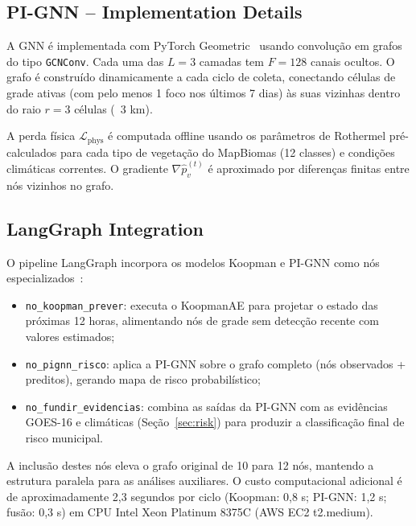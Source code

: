 \documentclass[preprint,times,numbers]{elsarticle}
\begin{document}
\subsection{PI-GNN -- Implementation Details}
\label{sec:pignn-impl}

A GNN é implementada com PyTorch Geometric~\cite{article:pyg2019,article:xu2019,article:hamilton2017,article:velickovic2018} usando convolução em grafos do tipo \texttt{GCNConv}. Cada uma das $L = 3$ camadas tem $F = 128$ canais ocultos. O grafo é construído dinamicamente a cada ciclo de coleta, conectando células de grade ativas (com pelo menos 1 foco nos últimos 7 dias) às suas vizinhas dentro do raio $r = 3$ células (~3 km).

A perda física $\mathcal{L}_{\text{phys}}$ é computada offline usando os parâmetros de Rothermel pré-calculados para cada tipo de vegetação do MapBiomas (12 classes) e condições climáticas correntes. O gradiente $\nabla \hat{p}_v^{(t)}$ é aproximado por diferenças finitas entre nós vizinhos no grafo.

\subsection{LangGraph Integration}
\label{sec:langgraph-impl}

O pipeline LangGraph incorpora os modelos Koopman e PI-GNN como nós especializados~\cite{article:xi2023,article:wang2024survey,article:park2023}:

\begin{itemize}
    \item \texttt{no\_koopman\_prever}: executa o KoopmanAE para projetar o estado das próximas 12 horas, alimentando nós de grade sem detecção recente com valores estimados;
    \item \texttt{no\_pignn\_risco}: aplica a PI-GNN sobre o grafo completo (nós observados + preditos), gerando mapa de risco probabilístico;
    \item \texttt{no\_fundir\_evidencias}: combina as saídas da PI-GNN com as evidências GOES-16 e climáticas (Seção~\ref{sec:risk}) para produzir a classificação final de risco municipal.
\end{itemize}

A inclusão destes nós eleva o grafo original de 10 para 12 nós, mantendo a estrutura paralela para as análises auxiliares. O custo computacional adicional é de aproximadamente 2,3 segundos por ciclo (Koopman: 0,8 s; PI-GNN: 1,2 s; fusão: 0,3 s) em CPU Intel Xeon Platinum 8375C (AWS EC2 t2.medium).
\end{document}
